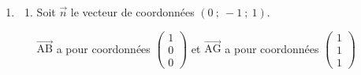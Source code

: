 \documentclass[10pt]{article}
\providecommand{\vect}[1]{\overrightarrow{#1}}
\providecommand{\vectt}[1]{\overrightarrow{\mathrm{#1}}}
\begin{document}
\begin{enumerate}
\begin{enumerate}
$\begin{aligned}[t]
\left\{
\begin{array}{l !{=} l }
k & \dfrac{1}{2}+\dfrac{1}{2} t \\[5pt]
\dfrac{1}{2}k & t \\[5pt]
\dfrac{1}{2}k & t
\end{array}
\right.
&
\iff
\left\{
\begin{array}{l !{=} l }
k & \dfrac{1}{2}+\dfrac{1}{2} t \\[5pt]
k & 2 t
\end{array} 
\right.
\iff
\left\{
\begin{array}{l !{=} l }
2t & \dfrac{1}{2}+\dfrac{1}{2} t \\[5pt]
k & 2 t
\end{array} 
\right.
\iff
\left\{
\begin{array}{l !{=} l }
\dfrac{3}{2} t & \dfrac{1}{2} \\[5pt]
k & 2 t
\end{array}
\right.\\
&
\iff
\left\{
\begin{array}{l !{=} l }
 t & \dfrac{1}{3} \\[5pt]
k & \dfrac{2}{3}
\end{array}
\right.
\end{aligned}$

Donc les droites (AJ) et (IG) sont sécantes.
Pour $k=\dfrac{2}{3}$, on a
$\left \{
\begin{array}{l !{=} l }
k & \dfrac{2}{3} \\[5pt]
\dfrac{1}{2}k &  \dfrac{1}{3} \\[5pt]
\dfrac{1}{2}k &  \dfrac{1}{3}
\end{array} 
\right.$

Le point S d'intersection des droites (AJ) et (IG) a donc pour coordonnées
$\left (\dfrac{2}{3}\;,\; \dfrac{1}{3} \;,\; \dfrac{1}{3}\right )$.
		\end{enumerate}

		\item \begin{enumerate}
			\item 
Soit $\vect{n}$ le vecteur de coordonnées $(0 ~;~-1 ~;~ 1)$.

$\vectt{AB}$ a pour coordonnées 
$\begin{pmatrix}
1\\ 0 \\ 0
\end{pmatrix}$
et $\vectt{AG}$ a pour coordonnées
$\begin{pmatrix}
1\\ 1\\1
\end{pmatrix}$


\end{enumerate}
\end{enumerate}
\end{document}
